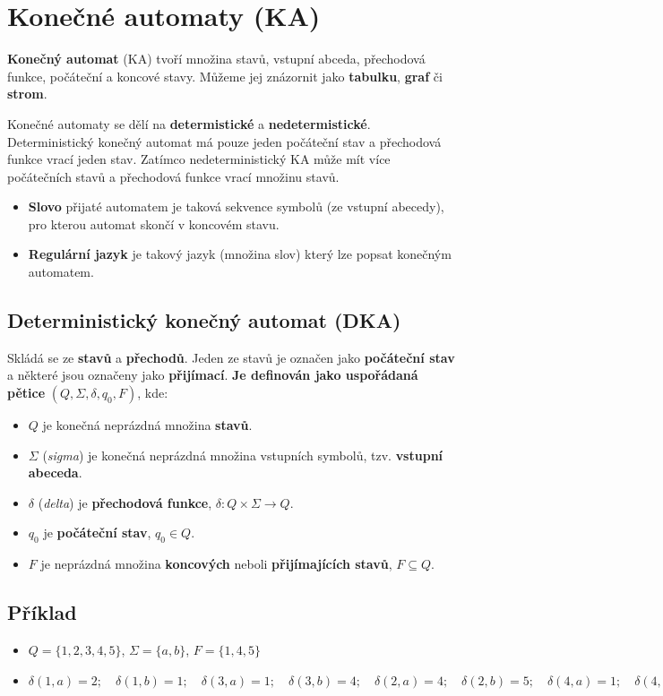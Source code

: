 \section{Konečné automaty (KA)}
\textbf{Konečný automat} (KA) tvoří množina stavů, vstupní abceda, přechodová funkce, počáteční a koncové stavy. Můžeme jej znázornit jako \textbf{tabulku}, \textbf{graf} či \textbf{strom}.

Konečné automaty se dělí na \textbf{determistické} a \textbf{nedetermistické}. Deterministický konečný automat má pouze jeden počáteční stav a přechodová funkce vrací jeden stav. Zatímco nedeterministický KA může mít více počátečních stavů a přechodová funkce vrací množinu stavů.

\begin{itemize}
    \item \textbf{Slovo} přijaté automatem je taková sekvence symbolů (ze vstupní abecedy), pro kterou automat skončí v koncovém stavu.
    \item \textbf{Regulární jazyk} je takový jazyk (množina slov) který lze popsat konečným automatem.
\end{itemize}

\subsection{Deterministický konečný automat (DKA)}
Skládá se ze \textbf{stavů} a \textbf{přechodů}. Jeden ze stavů je označen jako \textbf{počáteční stav} a některé jsou označeny jako \textbf{přijímací}. \textbf{Je definován jako uspořádaná pětice} $(Q, \Sigma, \delta, q_0, F)$, kde:
\begin{itemize}
    \item $Q$ je konečná neprázdná množina \textbf{stavů}.
    \item $\Sigma$ (\textit{sigma}) je konečná neprázdná množina vstupních symbolů, tzv. \textbf{vstupní abeceda}.
    \item $\delta$ (\textit{delta}) je \textbf{přechodová funkce}, $\delta: Q\times\Sigma \rightarrow Q$.
    \item $q_0$ je \textbf{počáteční stav}, $q_0 \in Q$.
    \item $F$ je neprázdná množina \textbf{koncových} neboli \textbf{přijímajících stavů}, $F \subseteq Q$.
\end{itemize}

\subsection*{Příklad}
\begin{itemize}
    \item $Q = \{1, 2, 3, 4, 5\}$, $\Sigma = \{a, b\}$, $F =  \{1, 4, 5\}$
    \item $\delta(1, a) = 2 ;\quad \delta(1, b) = 1   ;\quad \delta(3, a) = 1  ;\quad \delta(3, b) = 4; \quad  \delta(2, a) = 4  ; \quad  \delta(2, b) = 5; \quad  \delta(4, a) = 1;  \quad \delta(4, b) = 3;  \quad \delta(5, a) = 4; \quad  \delta(5, b) = 5$
\end{itemize}

